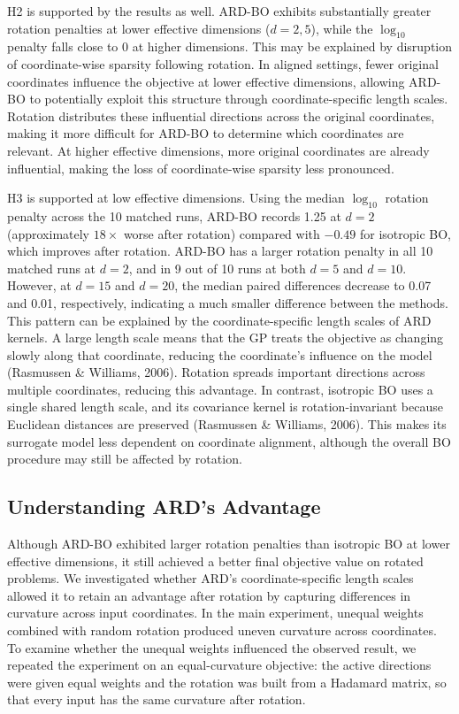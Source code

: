 \documentclass[11pt]{article}
\begin{document}
H2 is supported by the results as well. ARD-BO exhibits substantially greater rotation penalties at lower effective dimensions ($d = 2, 5$), while the $\log_{10}$ penalty falls close to 0 at higher dimensions. This may be explained by disruption of coordinate-wise sparsity following rotation. In aligned settings, fewer original coordinates influence the objective at lower effective dimensions, allowing ARD-BO to potentially exploit this structure through coordinate-specific length scales. Rotation distributes these influential directions across the original coordinates, making it more difficult for ARD-BO to determine which coordinates are relevant. At higher effective dimensions, more original coordinates are already influential, making the loss of coordinate-wise sparsity less pronounced.

H3 is supported at low effective dimensions. Using the median $\log_{10}$ rotation penalty across the 10 matched runs, ARD-BO records 1.25 at $d = 2$ (approximately $18\times$ worse after rotation) compared with $-0.49$ for isotropic BO, which improves after rotation. ARD-BO has a larger rotation penalty in all 10 matched runs at $d = 2$, and in 9 out of 10 runs at both $d = 5$ and $d = 10$. However, at $d = 15$ and $d = 20$, the median paired differences decrease to 0.07 and 0.01, respectively, indicating a much smaller difference between the methods. This pattern can be explained by the coordinate-specific length scales of ARD kernels. A large length scale means that the GP treats the objective as changing slowly along that coordinate, reducing the coordinate's influence on the model (Rasmussen \& Williams, 2006). Rotation spreads important directions across multiple coordinates, reducing this advantage. In contrast, isotropic BO uses a single shared length scale, and its covariance kernel is rotation-invariant because Euclidean distances are preserved (Rasmussen \& Williams, 2006). This makes its surrogate model less dependent on coordinate alignment, although the overall BO procedure may still be affected by rotation.

\subsection{Understanding ARD's Advantage}

Although ARD-BO exhibited larger rotation penalties than isotropic BO at lower effective dimensions, it still achieved a better final objective value on rotated problems. We investigated whether ARD's coordinate-specific length scales allowed it to retain an advantage after rotation by capturing differences in curvature across input coordinates. In the main experiment, unequal weights combined with random rotation produced uneven curvature across coordinates. To examine whether the unequal weights influenced the observed result, we repeated the experiment on an equal-curvature objective: the active directions were given equal weights and the rotation was built from a Hadamard matrix, so that every input has the same curvature after rotation.
\end{document}
